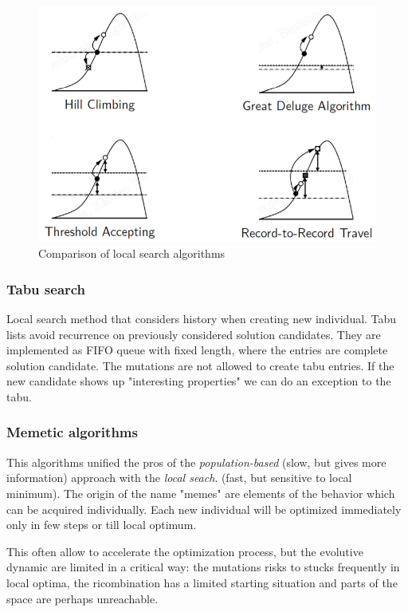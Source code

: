 \documentclass{article}
\begin{document}
\begin{figure}[H]
    \centering
    \includegraphics[scale=0.5]{images/comp_algo.png}
    \caption{Comparison of local search algorithms}
\end{figure}

\subsubsection{Tabu search}
Local search method that considers history when creating new individual. Tabu lists
avoid recurrence on previously considered solution candidates. They are implemented
as FIFO queue with fixed length, where the entries are complete solution candidate. The
mutations are not allowed to create tabu entries. If the new candidate shows up "interesting
properties" we can do an exception to the tabu.

\subsubsection{Memetic algorithms}
This algorithms unified the pros of the \textit{population-based} (slow, but gives more information) approach with the \textit{local seach}.
(fast, but sensitive to local minimum). The origin of the name "memes" are elements of the behavior
which can be acquired individually. Each new individual will be optimized immediately only in few
steps or till local optimum.

This often allow to accelerate the optimization process, but the evolutive dynamic are limited in a
critical way: the mutations risks to stucks frequently in local optima, the ricombination has a
limited starting situation and parts of the space are perhaps unreachable.
\end{document}
